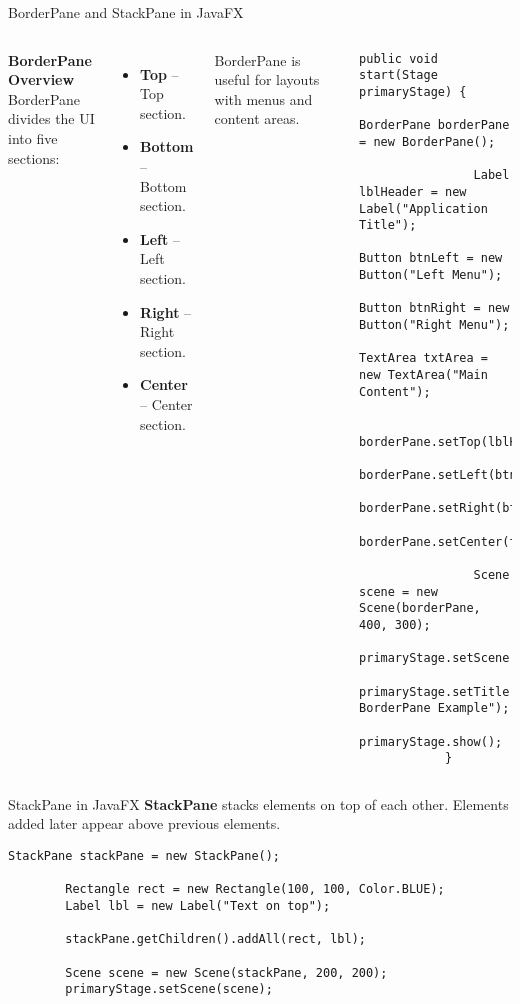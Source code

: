 \documentclass[aspectratio=169, table]{beamer}
\begin{document}
\begin{frame}[fragile]{BorderPane and StackPane in JavaFX}
	\begin{columns}[t]
		\textbf{BorderPane Overview} \\
		BorderPane divides the UI into five sections:
		\begin{itemize}
			\item \textbf{Top} – Top section.
			\item \textbf{Bottom} – Bottom section.
			\item \textbf{Left} – Left section.
			\item \textbf{Right} – Right section.
			\item \textbf{Center} – Center section.
		\end{itemize}
		BorderPane is useful for layouts with menus and content areas.
		
		\begin{lstlisting}[style=JavaStyle]
			public void start(Stage primaryStage) {
				BorderPane borderPane = new BorderPane();
				
				Label lblHeader = new Label("Application Title");
				Button btnLeft = new Button("Left Menu");
				Button btnRight = new Button("Right Menu");
				TextArea txtArea = new TextArea("Main Content");
				
				borderPane.setTop(lblHeader);
				borderPane.setLeft(btnLeft);
				borderPane.setRight(btnRight);
				borderPane.setCenter(txtArea);
				
				Scene scene = new Scene(borderPane, 400, 300);
				primaryStage.setScene(scene);
				primaryStage.setTitle("JavaFX BorderPane Example");
				primaryStage.show();
			}
		\end{lstlisting}
	\end{columns}
\end{frame}


\begin{frame}[fragile]{StackPane in JavaFX}
	\vspace{20pt}
	\textbf{StackPane} stacks elements on top of each other.  
	Elements added later appear above previous elements.
		\begin{lstlisting}[style=JavaStyle, caption=Stacking elements with StackPane]
		StackPane stackPane = new StackPane();
		
		Rectangle rect = new Rectangle(100, 100, Color.BLUE);
		Label lbl = new Label("Text on top");
		
		stackPane.getChildren().addAll(rect, lbl);
		
		Scene scene = new Scene(stackPane, 200, 200);
		primaryStage.setScene(scene);
	\end{lstlisting}
\end{frame}
\end{document}
